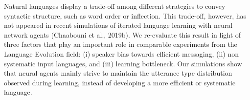 Natural languages display a trade-off among different strategies to convey syntactic structure, such as word order or inflection. This trade-off, however, has not appeared in recent simulations of iterated language learning with neural network agents (Chaabouni et al., 2019b). We re-evaluate this result in light of three factors that play an important role in comparable experiments from the Language Evolution field: (i) speaker bias towards efficient messaging, (ii) non systematic input languages, and (iii) learning bottleneck. Our simulations show that neural agents mainly strive to maintain the utterance type distribution observed during learning, instead of developing a more efficient or systematic language.
